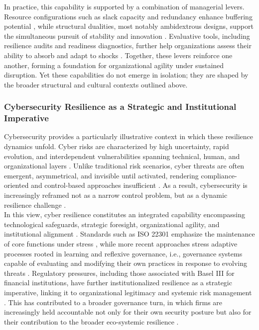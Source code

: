 In practice, this capability is supported by a combination of managerial levers. Resource configurations such as slack capacity and redundancy enhance buffering potential \autocite{barasa2018what}, while structural dualities, most notably ambidextrous designs, support the simultaneous pursuit of stability and innovation \autocite{bhamra2011resilience}. Evaluative tools, including resilience audits and readiness diagnostics, further help organizations assess their ability to absorb and adapt to shocks \autocite{calder2021iso, burnard2011organisational}. Together, these levers reinforce one another, forming a foundation for organizational agility under sustained disruption. Yet these capabilities do not emerge in isolation; they are shaped by the broader structural and cultural contexts outlined above.\\

\subsubsection{Cybersecurity Resilience as a Strategic and Institutional Imperative}

Cybersecurity provides a particularly illustrative context in which these resilience dynamics unfold. Cyber risks are characterized by high uncertainty, rapid evolution, and interdependent vulnerabilities spanning technical, human, and organizational layers \autocite{linkov2013resilience}. Unlike traditional risk scenarios, cyber threats are often emergent, asymmetrical, and invisible until activated, rendering compliance-oriented and control-based approaches insufficient \autocite{dupont2019cyberresilience}. As a result, cybersecurity is increasingly reframed not as a narrow control problem, but as a dynamic resilience challenge \autocite{dupont2019cyberresilience,linkov2013resilience}.\\

In this view, cyber resilience constitutes an integrated capability encompassing technological safeguards, strategic foresight, organizational agility, and institutional alignment \autocite{bjorck2015cyber, lostri2022shared}. Standards such as ISO 22301 emphasize the maintenance of core functions under stress \autocite{calder2021iso}, while more recent approaches stress adaptive processes rooted in learning and reflexive governance, i.e., governance systems capable of evaluating and modifying their own practices in response to evolving threats \autocite{hausken2020cyber}. Regulatory pressures, including those associated with Basel III for financial institutions, have further institutionalized resilience as a strategic imperative, linking it to organizational legitimacy and systemic risk management \autocite{baselcommittee2011basel, almeida2020challenges}. This has contributed to a broader governance turn, in which firms are increasingly held accountable not only for their own security posture but also for their contribution to the broader eco-systemic resilience \autocite{lostri2022shared, bjorck2015cyber, gillard2023efficient}.\\

